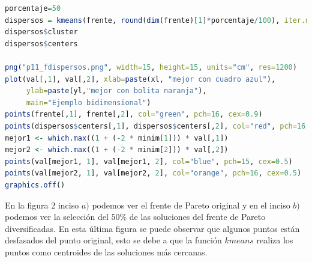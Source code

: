 \documentclass{article}
\begin{document}
\lstset{style=mystyle}
\begin{lstlisting}[language=R, caption= Código para diversificar las soluciones del frente de Pareto.]
porcentaje=50
dispersos = kmeans(frente, round(dim(frente)[1]*porcentaje/100), iter.max = 1000, nstart = 50, algorithm = "Lloyd")
dispersos$cluster
dispersos$centers

png("p11_fdispersos.png", width=15, height=15, units="cm", res=1200)
plot(val[,1], val[,2], xlab=paste(xl, "mejor con cuadro azul"),
     ylab=paste(yl,"mejor con bolita naranja"),
     main="Ejemplo bidimensional")
points(frente[,1], frente[,2], col="green", pch=16, cex=0.9)
points(dispersos$centers[,1], dispersos$centers[,2], col="red", pch=16, cex=0.6)
mejor1 <- which.max((1 + (-2 * minim[1])) * val[,1])
mejor2 <- which.max((1 + (-2 * minim[2])) * val[,2])
points(val[mejor1, 1], val[mejor1, 2], col="blue", pch=15, cex=0.5)
points(val[mejor2, 1], val[mejor2, 2], col="orange", pch=16, cex=0.5)
graphics.off()
\end{lstlisting}

En la figura 2 inciso $a)$ podemos ver el frente de Pareto original y en el inciso $b)$ podemos ver la selección del $50\%$ de las soluciones del frente de Pareto diversificadas. En esta última figura se puede observar que algunos puntos están desfasados del punto original, esto se debe a que la función $kmeans$ realiza los puntos como centroides de las soluciones más cercanas.
\end{document}
